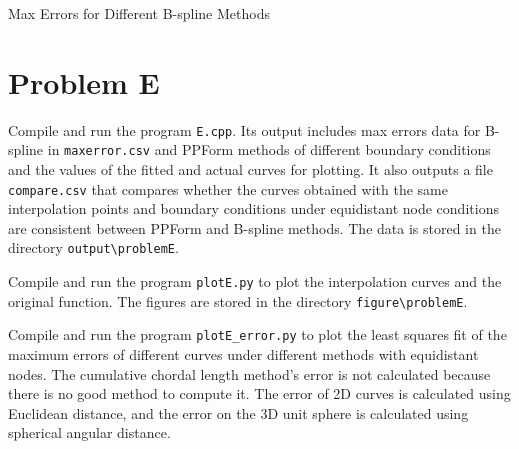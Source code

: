 \documentclass[a4paper]{article}
\begin{document}
\begin{sloppypar}
\begin{table}[H]
  \centering
  \renewcommand{\tablename}{Table.}
  \caption{Max Errors for Different B-spline Methods}
  \label{tab:maxerror_data}
\end{table}

\section{Problem E}
Compile and run the program \verb|E.cpp|. Its output includes max errors data for B-spline in \verb|maxerror.csv| and PPForm methods of different boundary conditions and the values of the fitted and actual curves for plotting. It also outputs a file \verb|compare.csv| that compares whether the curves obtained with the same interpolation points and boundary conditions under equidistant node conditions are consistent between PPForm and B-spline methods. The data is stored in the directory \verb|output\problemE|.

Compile and run the program \verb|plotE.py| to plot the interpolation curves
and the original function. The figures are stored in the directory
\verb|figure\problemE|.

Compile and run the program \verb|plotE_error.py| to plot the least squares fit
of the maximum errors of different curves under different methods with
equidistant nodes. The cumulative chordal length method's error is not
calculated because there is no good method to compute it. The error of 2D
curves is calculated using Euclidean distance, and the error on the 3D unit
sphere is calculated using spherical angular distance.


\end{sloppypar}
\end{document}
